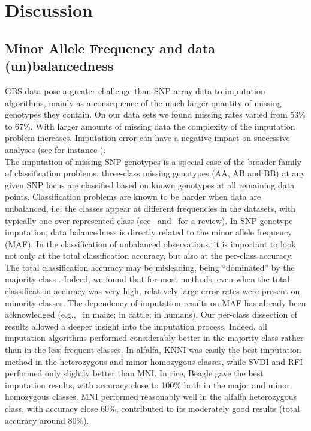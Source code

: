 \section{Discussion}
\label{sec:discussion}

\subsection{Minor Allele Frequency and data (un)balancedness}
\label{sec:maf}
GBS data pose a greater challenge than SNP-array data to imputation algorithms, mainly as a consequence of the much larger quantity of missing genotypes they contain. On our data sets we found missing rates varied from 53\% to 67\%. With larger amounts of missing data the complexity of the imputation problem increases. Imputation error can have a negative impact on successive analyses (see for instance \cite{rutkoski_imputation_2013,Annicchiarico2015}).\\
The imputation of missing SNP genotypes is a special case of the broader family of classification problems: three-class missing genotypes (AA, AB and BB) at any given SNP locus are classified based on known genotypes at all remaining data points. Classification problems are known to be harder when data are unbalanced, i.e. the classes appear at different frequencies in the datasets, with typically one over-represented class
(see~\cite{kotsiantis_handling_2006}
and~\cite{sun_classification_2009} for a review). In SNP genotype imputation, data balancedness is directly related to the minor allele frequency (MAF). In the classification of unbalanced observations, it is important to look not only at the total classification accuracy, but also at the per-class accuracy. The total classification accuracy may be misleading, being ``dominated'' by the majority class
\cite{he_learning_2009}.
Indeed, we found that for most methods, even when the total classification accuracy was very high, relatively large error rates were present on minority classes. 
The dependency of imputation results on MAF has already been acknowledged  (e.g.,~\cite{hickey_factors_2012} in maize; \cite{ma_comparison_2013} in cattle; \cite{pei_analyses_2008} in humans). Our per-class dissection of results allowed a deeper insight into the imputation process. Indeed, all imputation algorithms performed considerably better in the majority class rather than in the less frequent classes.
In alfalfa, KNNI was easily the best imputation method in the heterozygous and minor homozygous classes, while SVDI and RFI performed only slightly better than MNI. In rice, Beagle gave the best imputation results, with accuracy close to 100\% both in the major and minor homozygous classes. MNI performed reasonably well in the alfalfa heterozygous class, with accuracy close 60\%, contributed to its moderately good results (total accuracy around 80\%).

